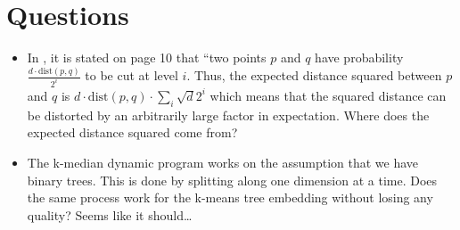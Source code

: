 \documentclass{article}
\theoremstyle{definition}
\begin{document}
\section{Questions}
\begin{itemize}
    \item In \cite{cohen2022scalable}, it is stated on page 10 that ``two points $p$ and $q$ have probability $\frac{d \cdot \text{dist}(p, q)}{2^i}$ to be cut at
        level $i$. Thus, the expected distance squared between $p$ and $q$ is $d \cdot \text{dist}(p, q) \cdot \sum_i \sqrt{d}2^i$ which means that the squared
        distance can be distorted by an arbitrarily large factor in expectation. Where does the expected distance squared come from?
    \item The k-median dynamic program works on the assumption that we have binary trees. This is done by splitting along one dimension at a time. Does the same
        process work for the k-means tree embedding without losing any quality? Seems like it should\dots
\end{itemize}

\printbibliography
\end{document}
